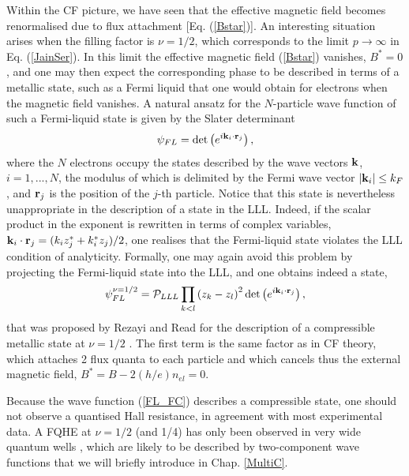 \documentclass[10pt]{book}
\newcommand{\bk}{{\bf k}}
\newcommand{\br}{{\bf r}}
\newcommand{\beq}{\begin{equation}}
\newcommand{\eeq}{\end{equation}}
\begin{document}
Within the CF picture, we have seen that the effective magnetic field becomes renormalised due to flux attachment [Eq. (\ref{Bstar})].
An interesting situation arises when the filling factor is $\nu=1/2$, which corresponds to the limit $p\to\infty$ in
Eq. (\ref{JainSer}). In this limit the effective magnetic field (\ref{Bstar}) vanishes, $B^*=0$, and one may then expect the corresponding
phase to be described in terms of a metallic state, such as a Fermi liquid that one would obtain for electrons when the magnetic
field vanishes. A natural ansatz for the $N$-particle wave function of such a
Fermi-liquid state is given by the Slater determinant
$$
\psi_{FL}=\det\left(e^{i\bk_i\cdot\br_j}\right),
$$
where the $N$ electrons occupy the states described by the wave vectors $\bk$, $i=1,...,N$, the modulus of which is delimited
by the Fermi wave vector $|\bk_i|\leq k_F$, and $\br_j$ is the position of the $j$-th particle. 
Notice that this state %
is nevertheless unappropriate in the description 
of a state in the LLL. Indeed, if the scalar product in the exponent is rewritten in terms of complex variables,
$\bk_i\cdot\br_j=(k_iz_j^*+k_i^*z_j)/2$, one realises that the Fermi-liquid state violates the LLL condition of
analyticity. Formally, one may again avoid this problem by projecting the Fermi-liquid state into the LLL, and one obtains
indeed a state,
\beq\label{FL_FC}
\psi_{FL}^{\nu=1/2}=\mathcal{P}_{LLL}\prod_{k<l}\left(z_k-z_l\right)^2\det\left(e^{i\bk_i\cdot\br_j}\right),
\eeq
that was proposed by Rezayi and Read for the description of a compressible metallic state at $\nu=1/2$ \cite{RR}.
The first term is the same factor as in CF theory, which attaches 2 flux quanta to each particle and which cancels thus
the external magnetic field, $B^*=B-2(h/e)n_{el}=0$.

Because the wave function (\ref{FL_FC}) describes a compressible state, one should not observe a quantised Hall resistance, in
agreement with most experimental data. A FQHE at $\nu=1/2$ (and 1/4) has only been observed in very wide 
quantum wells \cite{luhmann,shabani}, which are likely to be described by two-component wave functions \cite{papic} that
we will briefly introduce in Chap. \ref{MultiC}. 
\end{document}

